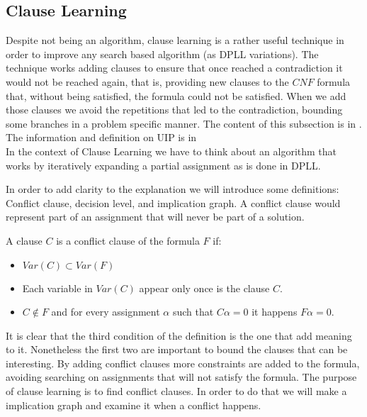 \subsection{Clause Learning}

Despite not being an algorithm, clause learning is a rather useful technique in order to improve any search based algorithm (as DPLL variations).  The technique works adding clauses to ensure that once reached a contradiction it would not be reached again, that is, providing new clauses to the $CNF$ formula that, without being satisfied, the formula could not be satisfied. When we add those clauses we avoid the repetitions that led to the contradiction, bounding some branches in a problem specific manner.  The content of this subsection is in \cite{tichy2006clause}. The information and definition on UIP is in \cite{zhang2001efficient} \\

In the context of Clause Learning we have to think about an algorithm that works by iteratively expanding a partial assignment as is done in DPLL.


In order to add clarity to the explanation we will introduce some definitions: Conflict clause, decision level, and implication graph. A conflict clause would represent part of an assignment that will never be part of a solution.  

\begin{definition}
  A clause $C$ is a conflict clause of the formula $F$ if:
  \begin{itemize}
  \item $Var(C) \subset Var(F)$
  \item Each variable in $Var(C)$ appear only once is the clause $C$.  
  \item $C \not\in F$ and for every assignment $\alpha$ such that $C\alpha = 0$ it happens $F\alpha = 0$.
  \end{itemize}
\end{definition}

It is clear that the third condition of the definition is the one that add meaning to it. Nonetheless the first two are important to bound the clauses that can be interesting. By adding conflict clauses more constraints are added to the formula, avoiding searching on assignments that will not satisfy the formula. The purpose of clause learning is to find conflict clauses. In order to do that we will make a implication graph and examine it when a conflict happens.\\

